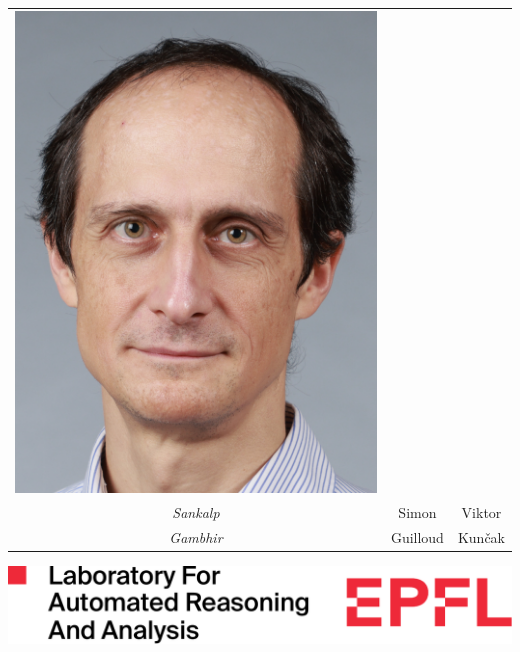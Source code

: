 \documentclass[
    aspectratio=169,
    xcolor={dvipsnames},
]{beamer}
\begin{document}
\begin{frame}
\begin{center}
\begin{tabular}{c c c}
            \includegraphics[width = \photowidth]{authors/viktor.png}  \\
            \emph{Sankalp}                                                    &
            Simon                                                      &
            Viktor                                                     \\
            \emph{Gambhir}                                                    &
            Guilloud                                                   &
            Kun\v cak
        \end{tabular}

    \vspace{5ex}
    \includegraphics[height=6ex]{fig/lara.pdf}
    \end{center}

\end{frame}
\end{document}
